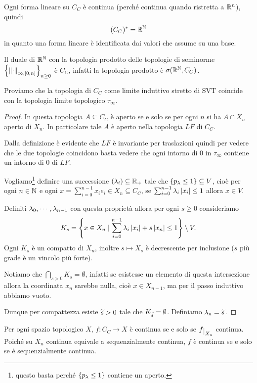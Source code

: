 \begin{remark}
Ogni forma lineare su $C_C$ \`e continua (perch\'e continua quando ristretta a $\mathbb{R}^n$), quindi
\[(C_C)^\ast=\mathbb{R}^{\mathbb{N}}\]
in quanto una forma lineare \`e identificata dai valori che assume su una base.
\end{remark}

\begin{exercise}
Il duale di $\mathbb{R}^{\mathbb{N}}$ con la topologia prodotto delle topologie di seminorme $\left\{{{\left\Vert{\cdot}\right\Vert}_{\infty,[0,n]}}\right\}_{n\geq 0}$ \`e $C_C$, infatti la topologia prodotto \`e $\sigma(\mathbb{R}^{\mathbb{N}},C_C)$.
\end{exercise}

\begin{exercise}
Proviamo che la topologia di $C_C$ come limite induttivo stretto di SVT coincide con la topologia limite topologico $\tau_\infty$.
\end{exercise}
\begin{proof}
In questa topologia $A\subseteq C_C$ \`e aperto se e solo se per ogni $n$ si ha $A\cap X_n$ aperto di $X_n$. In particolare tale $A$ \`e aperto nella topologia $LF$ di $C_C$.

Dalla definizione \`e evidente che $LF$ \`e invariante per traslazioni quindi per vedere che le due topologie coincidono basta vedere che ogni intorno di $0$ in $\tau_\infty$ contiene un intorno di $0$ di $LF$.

Vogliamo\footnote{questo basta perch\'e $\left\{{p_\lambda\leq 1}\right\}$ contiene un aperto.} definire una successione $(\lambda_i)\subseteq\mathbb{R}_+$ tale che $\left\{{p_\lambda\leq 1}\right\}\subseteq V$, cio\`e per ogni $n\in\mathbb{N}$ e ogni $x=\sum_{i=0}^{n-1} x_ie_i\in X_n\subseteq C_C$, se $\sum_{i=0}^{n-1}\lambda_i\left|{x_i}\right|\leq 1$ allora $x\in V$.

Definiti $\lambda_0,\cdots,\lambda_{n-1}$ con questa propriet\`a allora per ogni $s\geq 0$ consideriamo 
\[K_s=\left\{{x\in X_n\mid \sum_{i=0}^{n-1}\lambda_i\left|{x_i}\right|+s\left|{x_n}\right|\leq 1}\right\}\setminus V.\]
Ogni $K_s$ \`e un compatto di $X_n$, inoltre $s\mapsto X_s$ \`e decrescente per inclusione ($s$ pi\`u grade \`e un vincolo pi\`u forte).

Notiamo che $\bigcap_{s>0}K_s=\emptyset$, infatti se esistesse un elemento di questa intersezione allora la coordinata $x_n$ sarebbe nulla, cio\`e $x\in X_{n-1}$, ma per il passo induttivo abbiamo vuoto.

Dunque per compattezza esiste $\widetilde{s}>0$ tale che $K_{\widetilde{s}}=\emptyset$. Definiamo $\lambda_n=\widetilde{s}$.
\end{proof}

\begin{corollary}
Per ogni spazio topologico $X$, $f:C_C\to X$ \`e continua se e solo se $f\res{X_n}$ continua. Poich\'e su $X_n$ continua equivale a sequenzialmente continua, $f$ \`e continua se e solo se \`e sequenzialmente continua.
\end{corollary}



